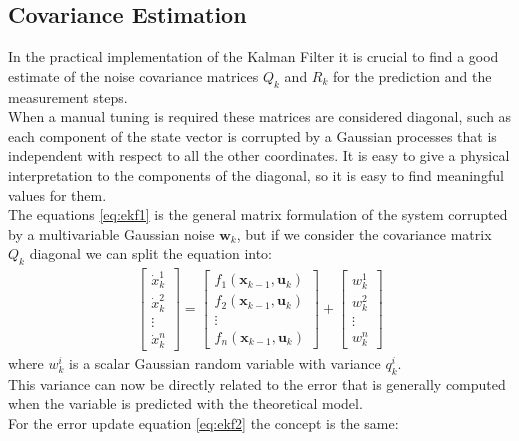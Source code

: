 \newpage
\subsection{Covariance Estimation}
In the practical implementation of the Kalman Filter it is crucial to find a good estimate of the noise covariance matrices $Q_k$ and $R_k$ for the prediction and the measurement steps. \\
When a manual tuning is required these matrices are considered diagonal, such as each component of the state vector is corrupted by a Gaussian processes that is independent with respect to all the other coordinates. It is easy to give a physical interpretation to the components of the diagonal, so it is easy to find meaningful values for them.\\
The equations \ref{eq:ekf1} is the general matrix formulation of the system corrupted by a multivariable Gaussian noise $\boldsymbol{w}_k$, but if we consider the covariance matrix $Q_k$ diagonal we can split the equation into:
\begin{align}
{\begin{bmatrix}
\dot{x}_k^1 \\[10pt]
\dot{x}_k^2 \\[10pt]
\vdots \\[10pt]
\dot{x}_k^n
\end{bmatrix}}=
{\begin{bmatrix}
 f_1(\boldsymbol{x}_{k-1},\boldsymbol{u}_k) \\[10pt]
f_2(\boldsymbol{x}_{k-1},\boldsymbol{u}_k)  \\[10pt]
\vdots \\[10pt]
f_n(\boldsymbol{x}_{k-1},\boldsymbol{u}_k) 
\end{bmatrix}} 
+ 
{\begin{bmatrix}
w_k^1 \\[10pt]
w_k^2 \\[10pt]
\vdots \\[10pt]
w_k^n
\end{bmatrix}}
\end{align}
where $w_k^i$ is a scalar Gaussian random variable with variance $q_k^i$.\\
This variance can now be directly related to the error that is generally computed when the variable is predicted with the theoretical model.\\
For the error update equation \ref{eq:ekf2} the concept is the same: 
